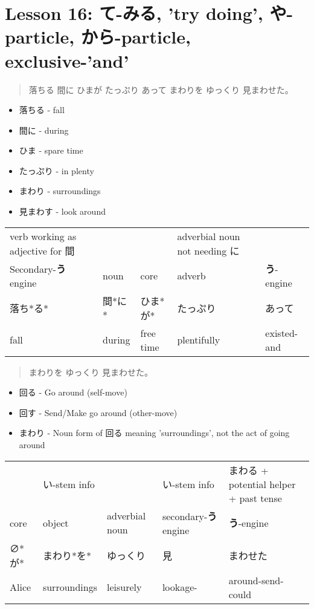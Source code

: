 \documentclass[11pt]{article}
\begin{document}
\section{Lesson 16: て-みる, 'try doing', や-particle, から-particle, exclusive-'and'}
\label{sec:org8e552ea}
\begin{quote}
落ちる 間に ひまが たっぷり あって まわりを ゆっくり 見まわせた。
\end{quote}
\begin{itemize}
\item 落ちる - fall
\item 間に - during
\item ひま - spare time
\item たっぷり - in plenty
\item まわり - surroundings
\item 見まわす - look around
\end{itemize}

\begin{center}
\begin{tabular}{lllll}
verb working as adjective for 間 &  &  & adverbial noun not needing に & \\
Secondary-\textbf{う} engine & noun & core & adverb & \textbf{う}-engine\\
落ち*る* & 間*に* & ひま*が* & たっぷり & あって\\
fall & during & free time & plentifully & existed-and\\
\end{tabular}
\end{center}

\begin{quote}
まわりを ゆっくり 見まわせた。
\end{quote}
\begin{itemize}
\item 回る - Go around (self-move)
\item 回す - Send/Make go around (other-move)
\item まわり - Noun form of 回る meaning 'surroundings', not the act of going around
\end{itemize}

\begin{center}
\begin{tabular}{lllll}
 & い-stem info &  & い-stem info & まわる + potential helper + past tense\\
core & object & adverbial noun & secondary-\textbf{う} engine & \textbf{う}-engine\\
∅*が* & まわり*を* & ゆっくり & 見 & まわせた\\
Alice & surroundings & leisurely & lookage- & around-send-could\\
\end{tabular}
\end{center}
\end{document}
